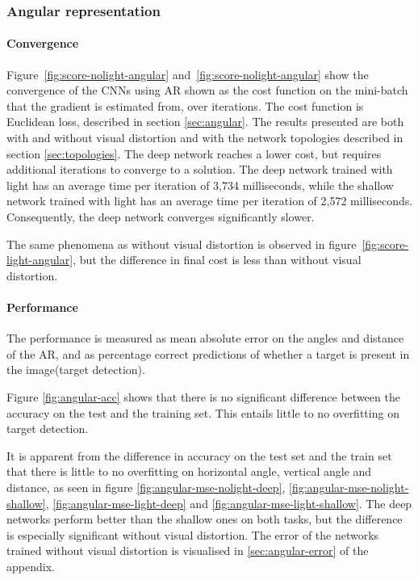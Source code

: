 

\subsubsection{Angular representation}
\paragraph{Convergence}
Figure~\ref{fig:score-nolight-angular} and~\ref{fig:score-nolight-angular} show the convergence of the CNNs using AR shown as the cost function on the mini-batch that the gradient is estimated from, over iterations. The cost function is Euclidean loss, described in section \ref{sec:angular}.
The results presented are both with and without visual distortion and with the network topologies described in section \ref{sec:topologies}. The deep network reaches a lower cost, but requires additional iterations to converge to a solution. The deep network trained with light has an average time per iteration of 3,734 milliseconds, while the shallow network trained with light has an average time per iteration of 2,572 milliseconds. Consequently, the deep network converges significantly slower.

The same phenomena as without visual distortion is observed in figure~\ref{fig:score-light-angular}, but the difference in final cost is less than without visual distortion.





\paragraph{Performance}
\label{sec:results-angular-representation}
The performance is measured as mean absolute error on the angles and distance of the AR, and as percentage correct predictions of whether a target is present in the image(target detection).

Figure \ref{fig:angular-acc} shows that there is no significant difference between the accuracy on the test and the training set. This entails little to no overfitting on target detection.

It is apparent from the difference in accuracy on the test set and the train set that there is little to no overfitting on horizontal angle, vertical angle and distance, as seen in figure \ref{fig:angular-mse-nolight-deep}, \ref{fig:angular-mse-nolight-shallow}, \ref{fig:angular-mse-light-deep} and \ref{fig:angular-mse-light-shallow}. The deep networks perform better than the shallow ones on both tasks, but the difference is especially significant without visual distortion. The error of the networks trained without visual distortion is visualised in \ref{sec:angular-error} of the appendix.

